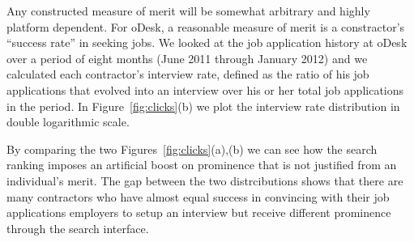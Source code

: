 
Any constructed measure of merit will be somewhat arbitrary and highly
platform dependent. For oDesk, a reasonable measure of merit is a
constractor's ``success rate'' in seeking jobs. We looked at the job
application history at oDesk over a period of eight months (June 2011
through January 2012) and we calculated each contractor's interview
rate, defined as the ratio of his job applications that evolved into
an interview over his or her total job applications in the period. In
Figure~\ref{fig:clicks}(b) we plot the interview rate distribution in
double logarithmic scale.

By comparing the two Figures~\ref{fig:clicks}(a),(b) we can see how
the search ranking imposes an artificial boost on prominence that is
not justified from an individual's merit.  The gap between the two
distrcibutions shows that there are many contractors who have almost
equal success in convincing with their job applications employers to
setup an interview but receive different prominence through the search
interface.



